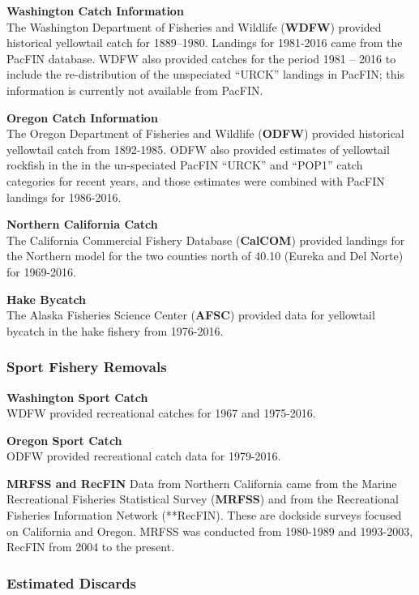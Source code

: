 \documentclass[12pt,]{article}
\begin{document}
\textbf{Washington Catch Information}\\
The Washington Department of Fisheries and Wildlife (\textbf{WDFW})
provided historical yellowtail catch for 1889--1980. Landings for
1981-2016 came from the PacFIN database. WDFW also provided catches for
the period 1981 -- 2016 to include the re-distribution of the
unspeciated ``URCK'' landings in PacFIN; this information is currently
not available from PacFIN.

\textbf{Oregon Catch Information}\\
The Oregon Department of Fisheries and Wildlife (\textbf{ODFW}) provided
historical yellowtail catch from 1892-1985. ODFW also provided estimates
of yellowtail rockfish in the in the un-speciated PacFIN ``URCK'' and
``POP1'' catch categories for recent years, and those estimates were
combined with PacFIN landings for 1986-2016.

\textbf{Northern California Catch}\\
The California Commercial Fishery Database (\textbf{CalCOM}) provided
landings for the Northern model for the two counties north of 40.10
(Eureka and Del Norte) for 1969-2016.

\textbf{Hake Bycatch}\\
The Alaska Fisheries Science Center (\textbf{AFSC}) provided data for
yellowtail bycatch in the hake fishery from 1976-2016.

\subsubsection{Sport Fishery Removals}\label{sport-fishery-removals}

\textbf{Washington Sport Catch}\\
WDFW provided recreational catches for 1967 and 1975-2016.

\textbf{Oregon Sport Catch}\\
ODFW provided recreational catch data for 1979-2016.

\textbf{MRFSS and RecFIN} Data from Northern California came from the
Marine Recreational Fisheries Statistical Survey (\textbf{MRFSS}) and
from the Recreational Fisheries Information Network (**RecFIN). These
are dockside surveys focused on California and Oregon. MRFSS was
conducted from 1980-1989 and 1993-2003, RecFIN from 2004 to the present.

\subsubsection{Estimated Discards}\label{estimated-discards}
\end{document}
